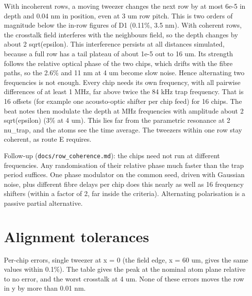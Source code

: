 With incoherent rows, a moving tweezer changes the next row by at most
6e-5 in depth and 0.04 nm in position, even at 3 um row pitch. This is
two orders of magnitude below the in-row figures of D1 (0.11\%, 3.5 nm).
With coherent rows, the crosstalk field interferes with the
neighbour\textquotesingle s field, so the depth changes by about 2
sqrt(epsilon). This interference persists at all distances simulated,
because a full row has a tail plateau of about 1e-5 out to 16 um. Its
strength follows the relative optical phase of the two chips, which
drifts with the fibre paths, so the 2.6\% and 11 nm at 4 um become slow
noise. Hence alternating two frequencies is not enough. Every chip needs
its own frequency, with all pairwise differences of at least 1 MHz, far
above twice the 84 kHz trap frequency. That is 16 offsets (for example
one acousto-optic shifter per chip feed) for 16 chips. The beat notes
then modulate the depth at MHz frequencies with amplitude about 2
sqrt(epsilon) (3\% at 4 um). This lies far from the parametric resonance
at 2 nu\_trap, and the atoms see the time average. The tweezers within
one row stay coherent, as route E requires.

Follow-up (\texttt{docs/row\_coherence.md}): the chips need not run at
different frequencies. Any randomisation of their relative phase much
faster than the trap period suffices. One phase modulator on the common
seed, driven with Gaussian noise, plus different fibre delays per chip
does this nearly as well as 16 frequency shifters (within a factor of 2,
far inside the criteria). Alternating polarisation is a passive partial
alternative.

\hypertarget{6-alignment-tolerances}{%
\section{Alignment tolerances}\label{stacked_relay-6-alignment-tolerances}}

Per-chip errors, single tweezer at x = 0 (the field edge, x = 60 um,
gives the same values within 0.1\%). The table gives the peak at the
nominal atom plane relative to no error, and the worst crosstalk at 4
um. None of these errors moves the row in y by more than 0.01 nm.

